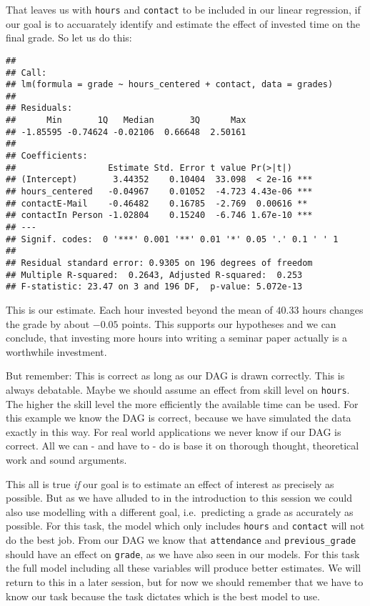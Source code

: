 \documentclass[
]{book}
\begin{document}
That leaves us with \texttt{hours} and \texttt{contact} to be included in our linear
regression, if our goal is to accuarately identify and estimate the effect of
invested time on the final grade. So let us do this:

\begin{verbatim}
## 
## Call:
## lm(formula = grade ~ hours_centered + contact, data = grades)
## 
## Residuals:
##      Min       1Q   Median       3Q      Max 
## -1.85595 -0.74624 -0.02106  0.66648  2.50161 
## 
## Coefficients:
##                  Estimate Std. Error t value Pr(>|t|)    
## (Intercept)       3.44352    0.10404  33.098  < 2e-16 ***
## hours_centered   -0.04967    0.01052  -4.723 4.43e-06 ***
## contactE-Mail    -0.46482    0.16785  -2.769  0.00616 ** 
## contactIn Person -1.02804    0.15240  -6.746 1.67e-10 ***
## ---
## Signif. codes:  0 '***' 0.001 '**' 0.01 '*' 0.05 '.' 0.1 ' ' 1
## 
## Residual standard error: 0.9305 on 196 degrees of freedom
## Multiple R-squared:  0.2643, Adjusted R-squared:  0.253 
## F-statistic: 23.47 on 3 and 196 DF,  p-value: 5.072e-13
\end{verbatim}

This is our estimate. Each hour invested beyond the mean of \(40.33\) hours
changes the grade by about \(-0.05\) points. This supports our hypotheses and we
can conclude, that investing more hours into writing a seminar paper actually
is a worthwhile investment.

But remember: This is correct as long as our DAG is drawn correctly. This is
always debatable. Maybe we should assume an effect from skill level on \texttt{hours}.
The higher the skill level the more efficiently the available time can be used.
For this example we know the DAG is correct, because we have simulated the data
exactly in this way. For real world applications we never know if our DAG is
correct. All we can - and have to - do is base it on thorough thought,
theoretical work and sound arguments.

This all is true \emph{if} our goal is to estimate an effect of interest as precisely
as possible. But as we have alluded to in the introduction to this session we
could also use modelling with a different goal, i.e.~predicting a grade as
accurately as possible. For this task, the model which only includes \texttt{hours} and
\texttt{contact} will not do the best job. From our DAG we know that \texttt{attendance} and
\texttt{previous\_grade} should have an effect on \texttt{grade}, as we have also seen in our
models. For this task the full model including all these variables will produce
better estimates. We will return to this in a later session, but for now we
should remember that we have to know our task because the task dictates which is
the best model to use.
\end{document}
